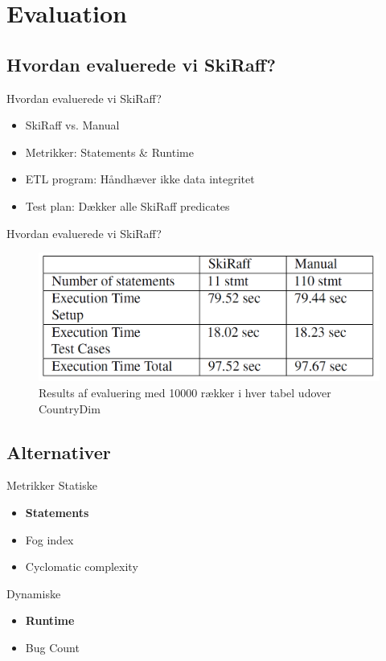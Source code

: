 \section{Evaluation}
\subsection{Hvordan evaluerede vi SkiRaff?}

\begin{frame}{Hvordan evaluerede vi SkiRaff?}{}
  \begin{itemize}
    \item<1-> SkiRaff vs. Manual
    \item<2-> Metrikker: Statements \& Runtime
    \item<3-> ETL program: Håndhæver ikke data integritet
    \item<4-> Test plan: Dækker alle SkiRaff predicates

  \end{itemize}
\end{frame}

\begin{frame}{Hvordan evaluerede vi SkiRaff?}{}
   \begin{figure}
        \centering
        \includegraphics[width=1\textwidth]{figures/EvalResults.png}
        \caption{Results af evaluering med 10000 rækker i hver tabel udover CountryDim}
        \label{Results of evaluation}
    \end{figure}
\end{frame}

\subsection{Alternativer}
\begin{frame}{Metrikker}{}
Statiske
  \begin{itemize}
    \item<1-> \textbf{Statements}
    \item<2-> Fog index
    \item<3-> Cyclomatic complexity
  	\end{itemize}

\pause
\pause
\pause
Dynamiske
  \begin{itemize}
    \item<4-> \textbf{Runtime}
    \item<5-> Bug Count
  	\end{itemize}
\end{frame}


